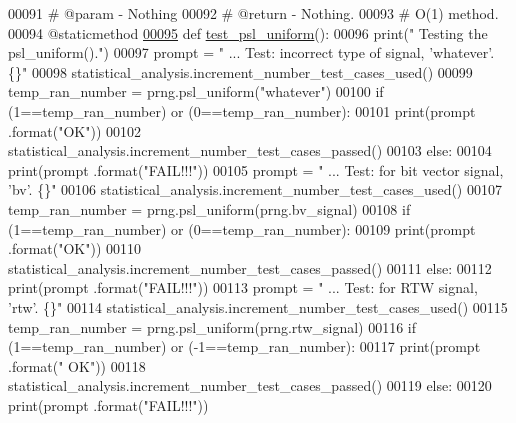 \begin{DoxyCode}
00091     \textcolor{comment}{#   @param - Nothing}
00092     \textcolor{comment}{#   @return - Nothing.}
00093     \textcolor{comment}{#   O(1) method.}
00094     @staticmethod
\hypertarget{pseudorandom__number__generator__tester_8py_source_l00095}{}\hyperlink{classrandom__process__models_1_1pseudorandom__number__generator__tester_1_1prng__tester_a5597ea984257dcd64376064fda82385d}{00095}     \textcolor{keyword}{def }\hyperlink{classrandom__process__models_1_1pseudorandom__number__generator__tester_1_1prng__tester_a5597ea984257dcd64376064fda82385d}{test\_psl\_uniform}():
00096         print(\textcolor{stringliteral}{" Testing the psl\_uniform()."})
00097         prompt = \textcolor{stringliteral}{"  ... Test: incorrect type of signal, 'whatever'.     \{\}"}
00098         statistical\_analysis.increment\_number\_test\_cases\_used()
00099         temp\_ran\_number = prng.psl\_uniform(\textcolor{stringliteral}{"whatever"})
00100         \textcolor{keywordflow}{if} (1==temp\_ran\_number) \textcolor{keywordflow}{or} (0==temp\_ran\_number):
00101             print(prompt .format(\textcolor{stringliteral}{"OK"}))
00102             statistical\_analysis.increment\_number\_test\_cases\_passed()
00103         \textcolor{keywordflow}{else}:
00104             print(prompt .format(\textcolor{stringliteral}{"FAIL!!!"}))
00105         prompt = \textcolor{stringliteral}{"  ... Test: for bit vector signal, 'bv'.          \{\}"}
00106         statistical\_analysis.increment\_number\_test\_cases\_used()
00107         temp\_ran\_number = prng.psl\_uniform(prng.bv\_signal)
00108         \textcolor{keywordflow}{if} (1==temp\_ran\_number) \textcolor{keywordflow}{or} (0==temp\_ran\_number):
00109             print(prompt .format(\textcolor{stringliteral}{"OK"}))
00110             statistical\_analysis.increment\_number\_test\_cases\_passed()
00111         \textcolor{keywordflow}{else}:
00112             print(prompt .format(\textcolor{stringliteral}{"FAIL!!!"}))
00113         prompt = \textcolor{stringliteral}{"  ... Test: for RTW signal, 'rtw'.        \{\}"}
00114         statistical\_analysis.increment\_number\_test\_cases\_used()
00115         temp\_ran\_number = prng.psl\_uniform(prng.rtw\_signal)
00116         \textcolor{keywordflow}{if} (1==temp\_ran\_number) \textcolor{keywordflow}{or} (-1==temp\_ran\_number):
00117             print(prompt .format(\textcolor{stringliteral}{"  OK"}))
00118             statistical\_analysis.increment\_number\_test\_cases\_passed()
00119         \textcolor{keywordflow}{else}:
00120             print(prompt .format(\textcolor{stringliteral}{"FAIL!!!"}))

\end{DoxyCode}
